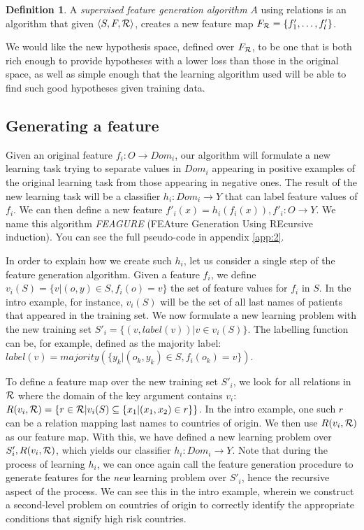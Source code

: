 \documentclass[twoside,11pt]{article}
\theoremstyle{definition}
\newtheorem{defn}{Definition}[section]
\begin{document}
\begin{defn}
	A \emph{supervised feature generation algorithm} $A$ using relations is an algorithm that given $\langle S,F,{\cal R} \rangle$, creates a new feature map $F_{{\cal R}}=\{f'_{1},\ldots,f'_{l}\}$.
\end{defn}

We would like the new hypothesis space, defined over $F_{{\cal R}}$, to be one that is both rich enough to provide hypotheses with a lower loss than those in the original space, as well as simple enough that the learning algorithm used will be able to find such good hypotheses given training data.

\subsection{Generating a feature} \label{algorithm_section} 

Given an original feature $f_{i}:O\rightarrow Dom_i$, our algorithm will formulate a new learning task trying to separate values in $Dom_i$ appearing in positive examples of the original learning task from those appearing in negative ones.  The result of the new learning task will be a classifier
$h_{i}:Dom_{i}\rightarrow Y$ that can label feature values of $f_{i}$. We can then define a new feature $f'_{i}(x)=h_{i}(f_{i}(x)), f'_{i}:O\rightarrow Y$.
We name this algorithm \emph{FEAGURE} (FEAture Generation Using REcursive induction). You can see the full pseudo-code in appendix \ref{app:2}.

In order to explain how we create such $h_{i}$, let us consider a single step of the feature generation algorithm.
Given a feature $f_{i}$, we define $v_i(S) = \{v | (o,y) \in S, f_{i}(o)=v\}$ the set of feature values for $f_i$ in $S$. In the intro example, for instance, $v_i(S)$ will be the set of all last names of patients that appeared in the training set.
We now formulate a new learning problem with the new training set
$S'_i = \{ (v, label(v)) | v \in v_i(S) \}$.
The labelling function can be, for example, defined as
the majority label: $label(v)=majority(\{y_k| \left(o_k,y_k \right) \in S, f_{i}(o_k)=v\})$.

To define a feature map over the new training set $S'_{i}$, we look for all relations in ${\cal R}$ where the domain of the key argument contains $v_i$:
$R(v_i,{\cal R}) = \left\{ r \in {\cal R} | v_i(S) \subseteq \{x_1 | (x_1,x_2) \in r\}\right\}$. In the intro example, one such $r$ can be a relation mapping last names to countries of origin. We then use $R(v_i,{\cal R})$ as our feature map.
With this, we have defined a new learning problem over $S'_{i}, R(v_i,{\cal R})$, which yields our classifier $h_{i}:Dom_{i}\rightarrow Y$.
Note that during the process of learning $h_{i}$, we can once again call the feature generation procedure to generate features for the \emph{new} learning problem over $S'_{i}$, hence the recursive aspect of the process. We can see this in the intro example, wherein we construct a second-level problem on countries of origin to correctly identify the appropriate conditions that signify high risk countries.
\end{document}

